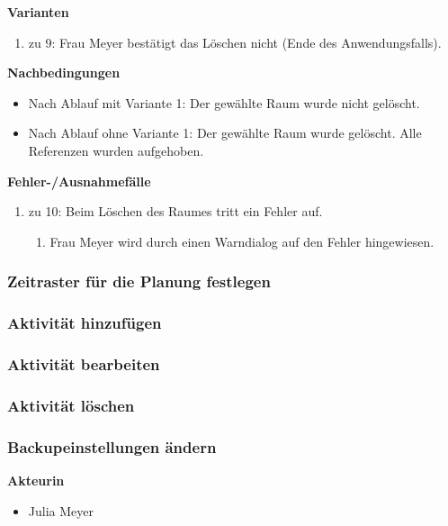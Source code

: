 \documentclass[fontsize=12pt,paper=a4,twoside]{scrartcl}
\begin{document}
\textbf{Varianten}
\begin{enumerate}
\item zu 9: Frau Meyer bestätigt das Löschen nicht (Ende des Anwendungsfalls).
\end{enumerate}
\vspace{5pt}

\textbf{Nachbedingungen}
\begin{itemize}
\item Nach Ablauf mit Variante 1: Der gewählte Raum wurde nicht gelöscht.
\item Nach Ablauf ohne Variante 1: Der gewählte Raum wurde gelöscht. Alle Referenzen wurden aufgehoben.
\end{itemize}
\vspace{5pt}

\textbf{Fehler-/Ausnahmefälle}
\begin{enumerate}
\item zu 10: Beim Löschen des Raumes tritt ein Fehler auf.
	\begin{enumerate}[label=\arabic*.]
	\item Frau Meyer wird durch einen Warndialog auf den Fehler hingewiesen.
	\end{enumerate}
\end{enumerate}

\subsubsection{Zeitraster für die Planung festlegen}

\subsubsection{Aktivität hinzufügen}

\subsubsection{Aktivität bearbeiten}

\subsubsection{Aktivität löschen}

\subsubsection{Backupeinstellungen ändern}
\textbf{Akteurin}
\begin{itemize}
\item Julia Meyer
\end{itemize}
\vspace{5pt}
\end{document}
